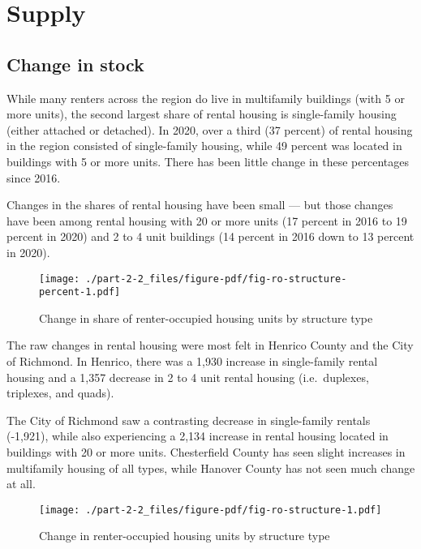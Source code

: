 \documentclass[
  letterpaper,
  DIV=11,
  numbers=noendperiod]{scrreprt}
\begin{document}
\hypertarget{supply-2}{%
\section{Supply}\label{supply-2}}

\hypertarget{change-in-stock-1}{%
\subsection{Change in stock}\label{change-in-stock-1}}

While many renters across the region do live in multifamily buildings
(with 5 or more units), the second largest share of rental housing is
single-family housing (either attached or detached). In 2020, over a
third (37 percent) of rental housing in the region consisted of
single-family housing, while 49 percent was located in buildings with 5
or more units. There has been little change in these percentages since
2016.

Changes in the shares of rental housing have been small --- but those
changes have been among rental housing with 20 or more units (17 percent
in 2016 to 19 percent in 2020) and 2 to 4 unit buildings (14 percent in
2016 down to 13 percent in 2020).

\begin{figure}

{\centering \texttt{[image: ./part-2-2\_files/figure-pdf/fig-ro-structure-percent-1.pdf]}

}

\caption{\label{fig-ro-structure-percent}Change in share of
renter-occupied housing units by structure type}

\end{figure}

The raw changes in rental housing were most felt in Henrico County and
the City of Richmond. In Henrico, there was a 1,930 increase in
single-family rental housing and a 1,357 decrease in 2 to 4 unit rental
housing (i.e.~duplexes, triplexes, and quads).

The City of Richmond saw a contrasting decrease in single-family rentals
(-1,921), while also experiencing a 2,134 increase in rental housing
located in buildings with 20 or more units. Chesterfield County has seen
slight increases in multifamily housing of all types, while Hanover
County has not seen much change at all.

\begin{figure}

{\centering \texttt{[image: ./part-2-2\_files/figure-pdf/fig-ro-structure-1.pdf]}

}

\caption{\label{fig-ro-structure}Change in renter-occupied housing units
by structure type}

\end{figure}
\end{document}
